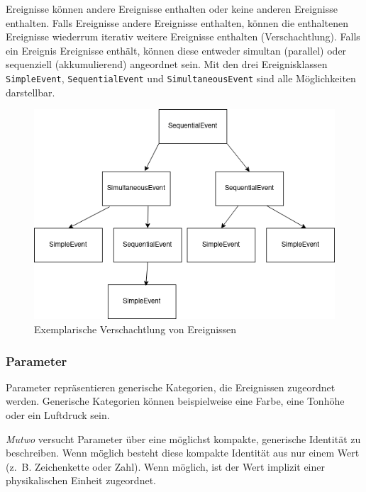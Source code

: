 \documentclass[12pt,a4paper,ngerman]{article}
\begin{document}
Ereignisse können andere Ereignisse enthalten oder keine anderen Ereignisse enthalten.
Falls Ereignisse andere Ereignisse enthalten, können die enthaltenen Ereignisse wiederrum iterativ weitere Ereignisse enthalten (Verschachtlung).
Falls ein Ereignis Ereignisse enthält, können diese entweder simultan (parallel) oder sequenziell (akkumulierend) angeordnet sein.
Mit den drei Ereignisklassen \texttt{SimpleEvent}, \texttt{SequentialEvent} und \texttt{SimultaneousEvent} sind alle Möglichkeiten darstellbar.

\begin{figure}[h!]
    \begin{center}
        \includegraphics[scale=0.65]{pictures/nested_event.png}

        \caption{Exemplarische Verschachtlung von Ereignissen}
    \end{center}
\end{figure}


\subsubsection{Parameter}
\label{parameterSpecification}

Parameter repräsentieren generische Kategorien, die Ereignissen zugeordnet werden.
Generische Kategorien können beispielweise eine Farbe, eine Tonhöhe oder ein Luftdruck sein.

\bigskip

\emph{Mutwo} versucht Parameter über eine möglichst kompakte, generische Identität zu beschreiben.
Wenn möglich besteht diese kompakte Identität aus nur einem Wert (z.~B. Zeichenkette oder Zahl).
Wenn möglich, ist der Wert implizit einer physikalischen Einheit zugeordnet.
\end{document}
